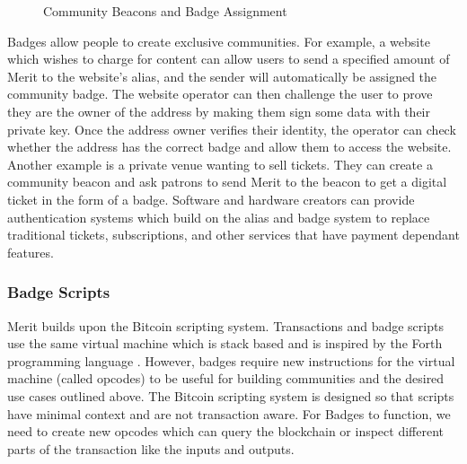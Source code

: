 \documentclass{article}
\begin{document}
\begin{figure}[H]
    \begin{center}
    \end{center}
    \caption{Community Beacons and Badge Assignment}
\end{figure}

Badges allow people to create exclusive communities. For example, a website
which wishes to charge for content can allow users to send a specified amount
of Merit to the website's alias, and the sender will automatically be assigned the
community badge. The website operator can then challenge the user to prove they
are the owner of the address by making them sign some data with their private
key. Once the address owner verifies their identity, the operator can check 
whether the address has the correct badge and allow them to access the website.
Another example is a private venue wanting to sell tickets. They can create a 
community beacon and ask patrons to send Merit to the beacon to get a digital
ticket in the form of a badge. Software and hardware creators can provide
authentication systems which build on the alias and badge system to replace
traditional tickets, subscriptions, and other services that have payment dependant
features.

\subsubsection{Badge Scripts}

Merit builds upon the Bitcoin scripting system. Transactions and badge scripts use
the same virtual machine which is stack based and is inspired by the Forth programming
language \cite{scripts}. However, badges require new instructions for the virtual
machine (called opcodes) to be useful for building communities and the desired
use cases outlined above. The Bitcoin scripting system is designed so that scripts
have minimal context and are not transaction aware. For Badges to function, we
need to create new opcodes which can query the blockchain or inspect different
parts of the transaction like the inputs and outputs.
\end{document}
